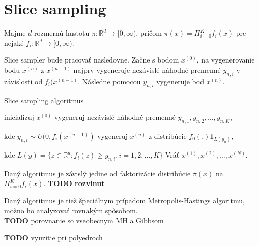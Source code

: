 \section{Slice sampling}

Majme $d$ rozmernú hustotu $\pi: \mathbb{R}^d \rightarrow [0,\infty)$, pričom $\pi(x) = \Pi^K_{i=0}f_i(x)$ pre nejaké $f_i: \mathbb{R}^d \rightarrow [0,\infty)$.

Slice sampler bude pracovať nasledovne. Začne s bodom $x^{(0)}$, na vygenerovanie bodu $x^{(n)}$ z $x^{(n-1)}$ najprv vygeneruje nezávislé náhodné premenné $y_{n,i}$ v závislosti od $f_i(x^{(n-1)}$. Následne pomocou $y_{n,i}$ vygeneruje bod $x^{(n)}$.

\begin{algorithm}[H]
	\caption{Slice sampling algoritmus \cite{slice_convergence_roberts}}
	\label{slice}
	\begin{algorithmic}[1]
		\State inicializuj $x^{(0)}$
			\State vygeneruj nezávislé náhodné premenné $y_{n,1},y_{n,2},\dots, y_{n,K}$,

			kde $y_{n,i} \sim U(0,f_i(x^{(n-1)})$
			\State vygeneruj $x^{(n)}$ z distribúcie $f_0(.)\mathbf{1}_{L(y_{n})}$,

			kde $L(y)= \{ z \in \mathbb{R}^d; f_i(z) \geq y_{n,i}, i=1,2, \dots, K\}$
		\EndFor
		\State Vráť ${x^{(1)},x^{(2)},\dots,x^{(N)}}$.
	\end{algorithmic}
\end{algorithm}

Daný algoritmus je závislý jedine od faktorizácie distribúcie $\pi(x)$ na $\Pi^K_{i=0}f_i(x)$. \textbf{TODO rozvinut}

Daný algoritmus je tiež špeciálnym prípadom Metropolis-Hastings algoritmu, možno ho analyzovať rovnakým spôsobom.\\

\textbf{TODO} porovnanie so vseobecnym MH a Gibbsom

\textbf{TODO} vyuzitie pri polyedroch
